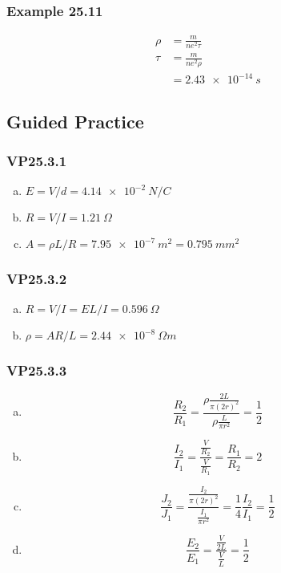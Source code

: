 \documentclass{article}
\begin{document}
\subsubsection{Example 25.11}

\begin{align*}
  \rho & = \frac{m}{n e^2 \tau} \\
  \tau & = \frac{m}{n e^2 \rho} \\
       & = \qty{2.43e-14}{s}
\end{align*}

\subsection{Guided Practice}

\subsubsection{VP25.3.1}

\begin{enumerate}[(a)]
  \item $E = V / d = \qty{4.14e-2}{N/C}$

  \item $R = V / I = \qty{1.21}{\Omega}$

  \item $A = \rho L / R = \qty{7.95e-7}{m^2} = \qty{0.795}{mm^2}$
\end{enumerate}

\subsubsection{VP25.3.2}

\begin{enumerate}[(a)]
  \item $R = V / I = E L / I = \qty{0.596}{\Omega}$

  \item $\rho = A R / L = \qty{2.44e-8}{\Omega m}$
\end{enumerate}

\subsubsection{VP25.3.3}

\begin{enumerate}[(a)]
  \item \[\frac{R_2}{R_1} = \frac{\rho \frac{2L}{\pi (2 r)^2}}{\rho \frac{L}{\pi r^2}} = \frac{1}{2}\]

  \item \[\frac{I_2}{I_1} = \frac{\frac{V}{R_2}}{\frac{V}{R_1}} = \frac{R_1}{R_2} = 2\]

  \item \[\frac{J_2}{J_1} = \frac{\frac{I_2}{\pi (2 r)^2}}{\frac{I_1}{\pi r^2}} = \frac{1}{4} \frac{I_2}{I_1} = \frac{1}{2}\]

  \item \[\frac{E_2}{E_1} = \frac{\frac{V}{2 L}}{\frac{V}{L}} = \frac{1}{2}\]
\end{enumerate}
\end{document}
